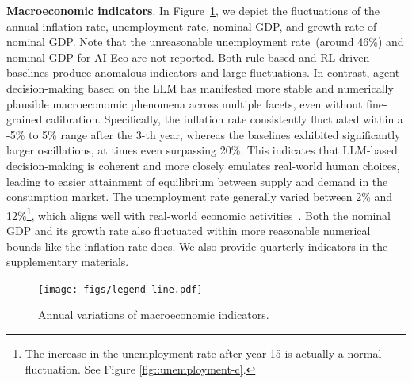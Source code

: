 \textbf{Macroeconomic indicators}. In Figure~\ref{fig::annual-indicators}, we depict the fluctuations of the annual inflation rate, unemployment rate, nominal GDP, and growth rate of nominal GDP. Note that the unreasonable unemployment rate~(around 46\%) and nominal GDP for AI-Eco are not reported. Both rule-based and RL-driven baselines produce anomalous indicators and large fluctuations. In contrast, agent decision-making based on the LLM has manifested more stable and numerically plausible macroeconomic phenomena across multiple facets, even without fine-grained calibration. Specifically, the inflation rate consistently fluctuated within a -5\% to 5\% range after the 3-th year, whereas the baselines exhibited significantly larger oscillations, at times even surpassing 20\%. This indicates that LLM-based decision-making is coherent and more closely emulates real-world human choices, leading to easier attainment of equilibrium between supply and demand in the consumption market. The unemployment rate generally varied between 2\% and 12\%\footnote{The increase in the unemployment rate after year 15 is actually a normal fluctuation. See Figure \ref{fig::unemployment-c}.}, which aligns well with real-world economic activities~\cite{gatti2011macroeconomics}. Both the nominal GDP and its growth rate also fluctuated within more reasonable numerical bounds like the inflation rate does. We also provide quarterly indicators in the supplementary materials.


\begin{figure}[h!]
\centering
\texttt{[image: figs/legend-line.pdf]} \
 \
 \
 \
 \
\caption{Annual variations of macroeconomic indicators.}\label{fig::annual-indicators}
\end{figure}


